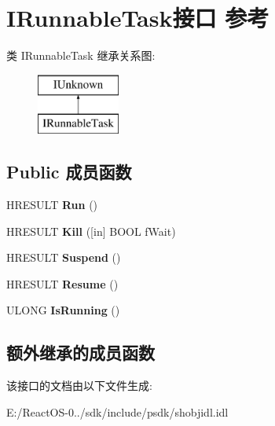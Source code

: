 \hypertarget{interface_i_runnable_task}{}\section{I\+Runnable\+Task接口 参考}
\label{interface_i_runnable_task}
类 I\+Runnable\+Task 继承关系图\+:\begin{figure}[H]
\begin{center}
\leavevmode
\includegraphics[height=2.000000cm]{interface_i_runnable_task}
\end{center}
\end{figure}
\subsection*{Public 成员函数}
\begin{DoxyCompactItemize}
\item 
\mbox{\label{interface_i_runnable_task_a9e622de43268c6e142c96d5b4d190297}} 
H\+R\+E\+S\+U\+LT {\bfseries Run} ()
\item 
\mbox{\label{interface_i_runnable_task_a5e98b560eb1fd27128671626c09136b7}} 
H\+R\+E\+S\+U\+LT {\bfseries Kill} (\mbox{[}in\mbox{]} B\+O\+OL f\+Wait)
\item 
\mbox{\label{interface_i_runnable_task_a07796c8daf105757e047f7b38980b29b}} 
H\+R\+E\+S\+U\+LT {\bfseries Suspend} ()
\item 
\mbox{\label{interface_i_runnable_task_a48fb4b747d3f87a57354219a4a5fd0ae}} 
H\+R\+E\+S\+U\+LT {\bfseries Resume} ()
\item 
\mbox{\label{interface_i_runnable_task_af65b3d8a793ac2e1352ac85f8c022c6f}} 
U\+L\+O\+NG {\bfseries Is\+Running} ()
\end{DoxyCompactItemize}
\subsection*{额外继承的成员函数}


该接口的文档由以下文件生成\+:\begin{DoxyCompactItemize}
\item 
E\+:/\+React\+O\+S-\/0../sdk/include/psdk/shobjidl.\+idl\end{DoxyCompactItemize}
